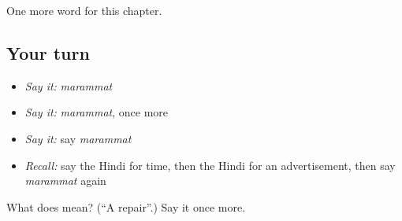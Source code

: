 \begin{grammarlens}[title={What you've built}]
One more word for this chapter.
\end{grammarlens}

\subsection*{Your turn}
\begin{itemize}
\raggedright
  \item \emph{Say it:} \emph{marammat}
  \item \emph{Say it:} \emph{marammat}, once more
  \item \emph{Say it:} say \emph{marammat}
  \item \emph{Recall:} say the Hindi for time, then the Hindi for an advertisement, then say \emph{marammat} again
\end{itemize}

\begin{tcolorbox}[breakable,colback=teal!4,colframe=teal!35!black,title={Before you move on}]
What does  mean? (\textquotedblleft{}A repair\textquotedblright{}.) Say it once more.
\end{tcolorbox}
